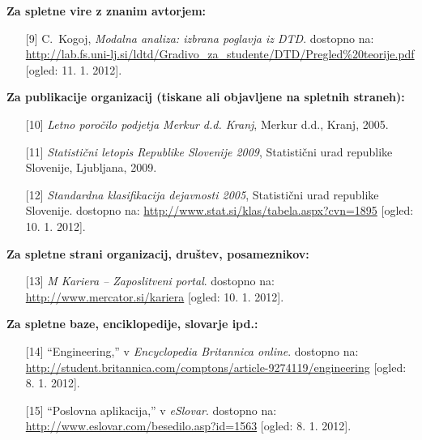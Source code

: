 \textbf{Za spletne vire z znanim avtorjem:}
\begin{itemize}
\item[{[9]}]C.~Kogoj, \emph{Modalna analiza: izbrana poglavja iz {DTD}}. 
dostopno na: 
\url{http://lab.fs.uni-lj.si/ldtd/Gradivo_za_studente/DTD/Pregled\%20teorije.pdf}
	[ogled: 11. 1. 2012].
\end{itemize}

\textbf{Za publikacije organizacij (tiskane ali objavljene na spletnih 
straneh):}
\begin{itemize}
\item[{[10]}] \emph{Letno poročilo podjetja {M}erkur d.d. {K}ranj}, {Merkur 
d.d., Kranj}, 2005.\\

\item[{[11]}] \emph{{Statistični letopis Republike Slovenije 2009}}, 
Statistični urad republike Slovenije, Ljubljana, 2009.\\

\item[{[12]}]\emph{Standardna klasifikacija dejavnosti 2005}, {Statistični urad 
republike Slovenije}. dostopno na: 
\url{http://www.stat.si/klas/tabela.aspx?cvn=1895}
[ogled: 10. 1. 2012].
\end{itemize}

\textbf{Za spletne strani organizacij, društev, posameznikov:}
\begin{itemize}
\item[{[13]}] \emph{M Kariera – Zaposlitveni portal}. dostopno na:
\url{http://www.mercator.si/kariera} [ogled: 10. 1. 2012].
\end{itemize}

\textbf{Za spletne baze, enciklopedije, slovarje ipd.:}
\begin{itemize}
\item[{[14]}] ``Engineering,'' v \emph{Encyclopedia Britannica online}. 
dostopno na:
\url{http://student.britannica.com/comptons/article-9274119/engineering}
[ogled: 8. 1. 2012].\\

\item[{[15]}] ``Poslovna aplikacija,'' v \emph{eSlovar}. dostopno na:
\url{http://www.eslovar.com/besedilo.asp?id=1563} [ogled: 8. 1. 2012].
\end{itemize}

